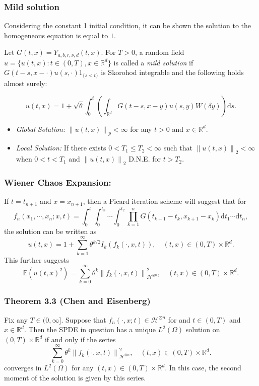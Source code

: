 \documentclass{beamer}%
\numberwithin{equation}{section}
\newcommand{\R}{\mathbb{R}}
\newcommand{\Norm}[1]{\left\|  #1   \right\|}
\newcommand{\ud}{\ensuremath{\mathrm{d} }}
\begin{document}
	\begin{frame}[t]
		\frametitle{Mild solution}
		Considering the constant 1 initial condition, it can be shown the solution to the homogeneous equation is equal to $1$.
		\begin{definition}
			Let $G(t,x) = Y_{a,b,r,\nu,d}(t,x)$. For $T > 0$, a random field $u=\{u(t,x): t \in (0,T), x \in \R^d \} $ is called a \textit{mild solution} if $G(t-s,x-\cdot)u(s,\cdot)1_{\{s<t\}}$ is Skorohod integrable and the following holds almost surely:
		\end{definition}
		\[
		u(t,x) = 1 + \sqrt{\theta} \int_0^t \left(\int_{\R^d} G(t-s,x-y)u(s,y)W(\delta y)\right) \ud s.
		\]

		\begin{itemize}
			\item \textit{Global Solution:} $\Norm{u(t,x)}_p < \infty$ for any $t>0$ and $x \in \R^d$.
			\item \textit{Local Solution:} If there exists $0 < T_1 \le T_2 < \infty$ such that $\Norm{u(t,x)}_2 < \infty$ when $0<t<T_1$ and $\Norm{u(t,x)}_2 $ D.N.E. for $t> T_2$.
		\end{itemize}
	\end{frame}


	\begin{frame}[t]
		\frametitle{Wiener Chaos Expansion:}
		If $t=t_{n+1}$ and $x=x_{n+1}$, then a Picard iteration scheme will suggest that for
		\[
		f_n(x_1, \cdots , x_n; x, t) = \int_0^t\int_0^{t_n}\cdots \int_0^{t_2} \prod_{k=1}^n G(t_{k+1}-t_k,x_{k+1}-x_k) \ud t_1 \cdots \ud t_n,
		\]
		the solution can be written as
		\begin{equation}\label{E:WC}
		u(t,x) = 1 + \sum_{k=1}^\infty \theta^{k/2} I_k(f_k(\cdot,x,t)), \quad (t,x)\in (0,T)\times \R^d.
		\end{equation}
		This further suggests
		\begin{equation}\label{E:2Mom}
		\mathbb{E}(u(t,x)^2) = \sum_{k=0}^\infty \theta^{k} \Norm{f_k(\cdot,x,t)}^2_{\mathcal{H}^{\otimes n}}, \quad (t,x)\in (0,T)\times \R^d.
		\end{equation}
	\end{frame}

	\begin{frame}[t]
		\frametitle{Theorem 3.3 (Chen and Eisenberg)}

		\begin{theorem}
			Fix any $T \in (0,\infty]$. Suppose that $f_n(\cdot,x;t) \in \mathcal{H}^{\otimes n}$ for and $t \in (0,T)$ and $x\in \R^d$. Then the SPDE in question has a unique $L^2(\Omega)$ solution on $(0,T) \times \R^d$ if and only if the series
			\[
			\sum_{k=0}^\infty \theta^{k} \Norm{f_k(\cdot,x,t)}^2_{\mathcal{H}^{\otimes n}}, \quad (t,x)\in (0,T)\times \R^d.
			\]
			converges in $L^2(\Omega)$ for any $(t,x) \in (0,T) \times \R^d$. In this case, the second moment of the solution is given by this series.
		\end{theorem}
	\end{frame}
\end{document}
